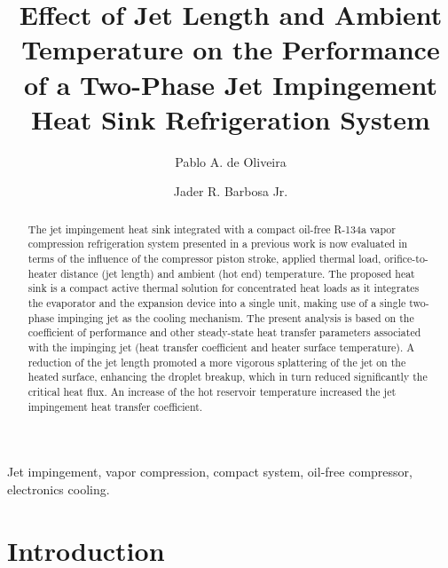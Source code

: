 \documentclass[review,preprint,12pt]{elsarticle}
\begin{document}
\begin{frontmatter}

\title{Effect of Jet Length and Ambient Temperature on the Performance of a Two-Phase Jet Impingement Heat Sink Refrigeration System}
\author{Pablo A. de Oliveira}
\author{Jader R. Barbosa Jr.}
\address{POLO Research Laboratories for Emerging Technologies in Cooling and Thermophysics, Department of Mechanical Engineering, Federal University of Santa Catarina (UFSC), Florian\'{o}polis, SC, 88040900, Brazil, Phone/Fax: (+ 55) 48 3721-7900}

\begin{abstract}

The jet impingement heat sink integrated with a compact oil-free R-134a vapor compression refrigeration system presented in a previous work \cite{OliveiraBarbosaJr.2016} is now evaluated in terms of the influence of the compressor piston stroke, applied thermal load, orifice-to-heater distance (jet length) and ambient (hot end) temperature. The proposed heat sink is a compact active thermal solution for concentrated heat loads as it integrates the evaporator and the expansion device into a single unit, making use of a single two-phase impinging jet as the cooling mechanism. The present analysis is based on the coefficient of performance and other steady-state heat transfer parameters associated with the impinging jet (heat transfer coefficient and heater surface temperature). A reduction of the jet length promoted a more vigorous splattering of the jet on the heated surface, enhancing the droplet breakup, which in turn reduced significantly the critical heat flux. An increase of the hot reservoir temperature increased the jet impingement heat transfer coefficient.

\end{abstract}

\end{frontmatter}

\vspace{0.5cm}

 Jet impingement, vapor compression, compact system, oil-free compressor, electronics cooling.

\printnomenclature[1.4cm]

\pagebreak

\section{Introduction}
\end{document}
